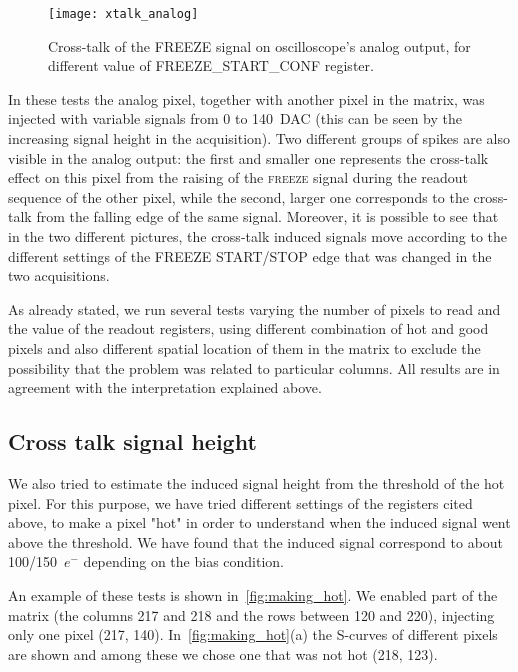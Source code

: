 \begin{figure}[h!]
\centering
\texttt{[image: xtalk\_analog]}
\caption{Cross-talk of the \textsc{FREEZE} signal on oscilloscope's analog output, for different value of \textsc{FREEZE\_START\_CONF} register.}
\label{fig:analog_xtalk}
\end{figure}

In these tests the analog pixel, together with another pixel in the matrix, was injected with variable signals from 0 to \SI{140}{DAC} (this can be seen by the increasing signal height in the acquisition). Two different groups of spikes are also visible in the analog output: the first and smaller one represents the cross-talk effect on this pixel from the raising of the \textsc{freeze} signal during the readout sequence of the other pixel, while the second, larger one corresponds to the cross-talk from the falling edge of the same signal.
Moreover, it is possible to see that in the two different pictures, the cross-talk induced signals move according to the different settings of the \textsc{FREEZE START/STOP} edge that was changed in the two acquisitions.

As already stated, we run several tests varying the number of pixels to read and the value of the readout registers, using different combination of hot and good pixels and also different spatial location of them in the matrix to exclude the possibility that the problem was related to particular columns. All results are in agreement with the interpretation explained above.\\


\subsection{Cross talk signal height}


We also tried to estimate the induced signal height from the threshold of the hot pixel. For this purpose, we have tried different settings of the registers cited above, to make a pixel "hot" in order to understand when the induced signal went above the threshold. We have found that the induced signal correspond to about 100/150~$e^{-}$ depending on the bias condition.

An example of these tests is shown in~\autoref{fig:making_hot}. We enabled part of the matrix (the columns 217 and 218 and the rows between 120 and 220), injecting only one pixel (217, 140). In~\autoref{fig:making_hot}(a) the S-curves of different pixels are shown and among these we chose one that was not hot (218, 123).

